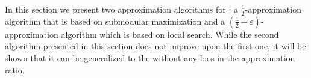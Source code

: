 In this section we present two approximation algorithms for \carpool:
a $\frac{1}{2}$-approximation algorithm that is based on submodular
maximization and a $(\frac{1}{2} - \varepsilon)$-approximation algorithm
which is based on local search.
While the second algorithm presented in this section does not improve upon the
first one, it will be shown that it can be generalized to the \gcp without any
loos in the approximation ratio.
 

